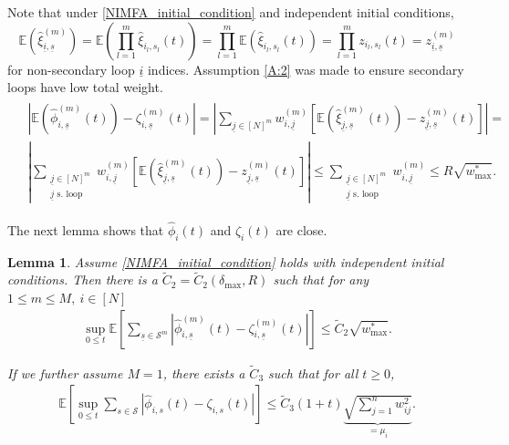 \documentclass{article}
\newcommand{\E}{\mathbb{E}}
\newcommand{\1}[1]{{\mathds{1}}_{\left\{#1\right\}}}
\renewcommand{\S}{\mathcal{S}}
\newtheorem{lemma}{Lemma}
\newcommand{\remm}[1]{{#1}}
\begin{document}
	Note that under \eqref{NIMFA_initial_condition} and independent initial conditions,
	$$\E \left(\hat{\xi}_{\underline{i},\underline{s}}^{(m)} \right)=\E \left(\prod_{l=1}^{m} \hat{\xi}_{i_l,s_l}(t) \right)=\prod_{l=1}^{m}\E \left( \hat{\xi}_{i_l,s_l}(t) \right)=\prod_{l=1}^{m} z_{i_l,s_l}(t)=z_{\underline{i},\underline{s}}^{(m)}$$
	for non-secondary loop $\underline{i}$ indices. Assumption \eqref{A:2} was made to ensure secondary loops have low total weight. 
	\begin{align}
		\label{eq:diagonal_in_lemma}
		\begin{split}
			&\left|\E \left(\hat{\phi}_{i,\underline{s}}^{(m)}(t) \right)-\zeta_{i,\underline{s}}^{(m)}(t) \right|=\left|\sum_{\underline{j} \in [N]^{m}} w_{i,\underline{j}}^{(m)}\left[\E \left(\hat{\xi}_{\underline{j},\underline{s}}^{(m)}(t)\right)-z_{\underline{j},\underline{s}}^{(m)}(t) \right] \right|=\\
			& \left|\sum_{\substack{\underline{j} \in [N]^{m}\\ \underline{j} \textrm{ s. loop}}} w_{i,\underline{j}}^{(m)}\left[\E \left(\hat{\xi}_{\underline{j},\underline{s}}^{(m)}(t)\right)-z_{\underline{j},\underline{s}}^{(m)}(t) \right] \right| \leq \sum_{\substack{\underline{j} \in [N]^{m}\\ \underline{j} \textrm{ s. loop}}} w_{i,\underline{j}}^{(m)} \leq R \sqrt{\remm{w_{\max}^{*}}}.
		\end{split}
	\end{align}
	
	The next lemma shows that $\hat{\phi}_{i}(t)$ and $\zeta_{i}(t)$ are close.
	\begin{lemma}
		\label{l:intermediate}
		Assume \eqref{NIMFA_initial_condition} holds with independent initial conditions. Then there is a $\tilde{C}_2=\tilde{C}_2\left(\delta_{\max},R\right)$ such that for any $1 \leq m \leq M, \ i \in [N]$
		\begin{align}
			\label{eq:lemma3a}
			\sup_{0 \leq t}\E \left[ \sum_{\underline{s} \in \S^m} \left|\hat{\phi}_{i,\underline{s}}^{(m)}(t)-\zeta_{i,\underline{s}}^{(m)}(t) \right| \right] \leq \tilde{C}_2 \sqrt{\remm{w_{\max}^{*}}}.
		\end{align}
		
		If we further assume $M=1$, there exists a $\tilde{C}_3$  such that for all $t \geq 0$,
		\begin{align}
			\label{eq:lemma3b}
			\E \left[ \sup_{0 \leq t} \sum_{s \in \S} \left|\hat{\phi}_{i,s}(t)-\zeta_{i,s}(t) \right| \right] \leq \tilde{C}_3\remm{(1+t)} \underbrace{\sqrt{\sum_{j=1}^n w_{ij}^2}}_{=\mu_i}.
		\end{align}
	\end{lemma} 
	
\end{document}
